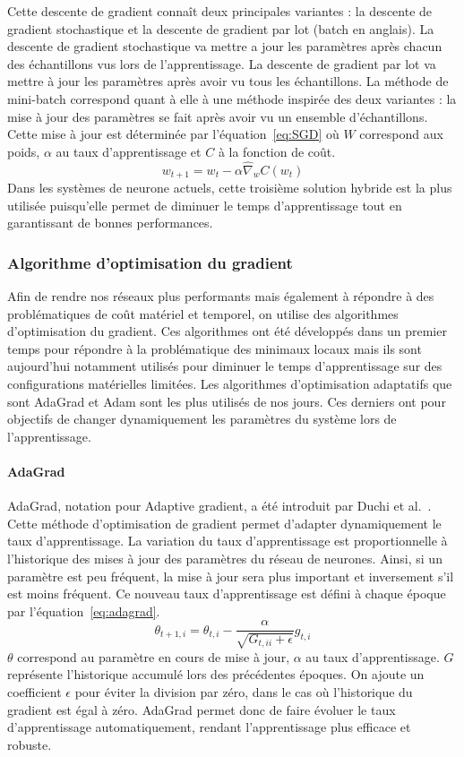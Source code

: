 Cette descente de gradient connaît deux principales variantes : la descente de gradient stochastique et la descente de gradient par lot (batch en anglais). La descente de gradient stochastique va mettre a jour les paramètres après chacun des échantillons vus lors de l'apprentissage. La descente de gradient par lot va mettre à jour les paramètres après avoir vu tous les échantillons. La méthode de mini-batch correspond quant à elle à une méthode inspirée des deux variantes : la mise à jour des paramètres se fait après avoir vu un ensemble d'échantillons. Cette mise à jour est déterminée par l'équation~\ref{eq:SGD} où $W$ correspond aux poids, $\alpha$ au taux d'apprentissage et $C$ à la fonction de coût.
\begin{equation}
  w_{t+1} = w_{t} - \alpha\hat{\nabla}_{w}{C(w_{t})}
  \label{eq:SGD}
\end{equation}
Dans les systèmes de neurone actuels, cette troisième solution hybride est la plus utilisée puisqu'elle permet de diminuer le temps d'apprentissage tout en garantissant de bonnes performances.


\subsubsection{Algorithme d'optimisation du gradient}
Afin de rendre nos réseaux plus performants mais également à répondre à des problématiques de coût matériel et temporel, on utilise des algorithmes d'optimisation du gradient. Ces algorithmes ont été développés dans un premier temps pour répondre à la problématique des minimaux locaux mais ils sont aujourd'hui notamment utilisés pour diminuer le temps d'apprentissage sur des configurations matérielles limitées.
Les algorithmes d'optimisation adaptatifs que sont AdaGrad et Adam sont les plus utilisés de nos jours. Ces derniers ont pour objectifs de changer dynamiquement les paramètres du système lors de l'apprentissage.

\paragraph{AdaGrad}
AdaGrad, notation pour Adaptive gradient, a été introduit par Duchi et al.~\cite{Duchi2011}. Cette méthode d'optimisation de gradient permet d'adapter dynamiquement le taux d'apprentissage. La variation du taux d'apprentissage est proportionnelle à l'historique des mises à jour des paramètres du réseau de neurones. Ainsi, si un paramètre est peu fréquent, la mise à jour sera plus important et inversement s'il est moins fréquent. Ce nouveau taux d'apprentissage est défini à chaque époque par l'équation~\ref{eq:adagrad}.
\begin{equation}
  \theta_{t+1, i} = \theta_{t, i} - \frac{\alpha}{\sqrt{G_{t, ii} + \epsilon}}g_{t, i}
  \label{eq:adagrad}
\end{equation}
$\theta$ correspond au paramètre en cours de mise à jour, $\alpha$ au taux d'apprentissage. $G$ représente l'historique accumulé lors des précédentes époques. On ajoute un coefficient $\epsilon$ pour éviter la division par zéro, dans le cas où l'historique du gradient est égal à zéro. AdaGrad permet donc de faire évoluer le taux d'apprentissage automatiquement, rendant l'apprentissage plus efficace et robuste.

